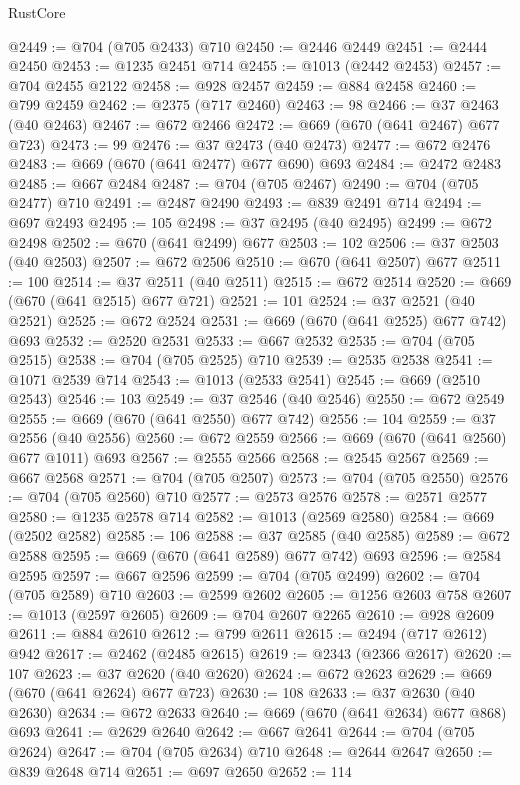 \begin{lexlean}{RustCore}
\begin{coremodule}
@2449 := @704 (@705 @2433) @710
@2450 := @2446 @2449
@2451 := @2444 @2450
@2453 := @1235 @2451 @714
@2455 := @1013 (@2442 @2453)
@2457 := @704 @2455 @2122
@2458 := @928 @2457
@2459 := @884 @2458
@2460 := @799 @2459
@2462 := @2375 (@717 @2460)
@2463 := 98
@2466 := @37 @2463 (@40 @2463)
@2467 := @672 @2466
@2472 := @669 (@670 (@641 @2467) @677 @723)
@2473 := 99
@2476 := @37 @2473 (@40 @2473)
@2477 := @672 @2476
@2483 := @669 (@670 (@641 @2477) @677 @690) @693
@2484 := @2472 @2483
@2485 := @667 @2484
@2487 := @704 (@705 @2467)
@2490 := @704 (@705 @2477) @710
@2491 := @2487 @2490
@2493 := @839 @2491 @714
@2494 := @697 @2493
@2495 := 105
@2498 := @37 @2495 (@40 @2495)
@2499 := @672 @2498
@2502 := @670 (@641 @2499) @677
@2503 := 102
@2506 := @37 @2503 (@40 @2503)
@2507 := @672 @2506
@2510 := @670 (@641 @2507) @677
@2511 := 100
@2514 := @37 @2511 (@40 @2511)
@2515 := @672 @2514
@2520 := @669 (@670 (@641 @2515) @677 @721)
@2521 := 101
@2524 := @37 @2521 (@40 @2521)
@2525 := @672 @2524
@2531 := @669 (@670 (@641 @2525) @677 @742) @693
@2532 := @2520 @2531
@2533 := @667 @2532
@2535 := @704 (@705 @2515)
@2538 := @704 (@705 @2525) @710
@2539 := @2535 @2538
@2541 := @1071 @2539 @714
@2543 := @1013 (@2533 @2541)
@2545 := @669 (@2510 @2543)
@2546 := 103
@2549 := @37 @2546 (@40 @2546)
@2550 := @672 @2549
@2555 := @669 (@670 (@641 @2550) @677 @742)
@2556 := 104
@2559 := @37 @2556 (@40 @2556)
@2560 := @672 @2559
@2566 := @669 (@670 (@641 @2560) @677 @1011) @693
@2567 := @2555 @2566
@2568 := @2545 @2567
@2569 := @667 @2568
@2571 := @704 (@705 @2507)
@2573 := @704 (@705 @2550)
@2576 := @704 (@705 @2560) @710
@2577 := @2573 @2576
@2578 := @2571 @2577
@2580 := @1235 @2578 @714
@2582 := @1013 (@2569 @2580)
@2584 := @669 (@2502 @2582)
@2585 := 106
@2588 := @37 @2585 (@40 @2585)
@2589 := @672 @2588
@2595 := @669 (@670 (@641 @2589) @677 @742) @693
@2596 := @2584 @2595
@2597 := @667 @2596
@2599 := @704 (@705 @2499)
@2602 := @704 (@705 @2589) @710
@2603 := @2599 @2602
@2605 := @1256 @2603 @758
@2607 := @1013 (@2597 @2605)
@2609 := @704 @2607 @2265
@2610 := @928 @2609
@2611 := @884 @2610
@2612 := @799 @2611
@2615 := @2494 (@717 @2612) @942
@2617 := @2462 (@2485 @2615)
@2619 := @2343 (@2366 @2617)
@2620 := 107
@2623 := @37 @2620 (@40 @2620)
@2624 := @672 @2623
@2629 := @669 (@670 (@641 @2624) @677 @723)
@2630 := 108
@2633 := @37 @2630 (@40 @2630)
@2634 := @672 @2633
@2640 := @669 (@670 (@641 @2634) @677 @868) @693
@2641 := @2629 @2640
@2642 := @667 @2641
@2644 := @704 (@705 @2624)
@2647 := @704 (@705 @2634) @710
@2648 := @2644 @2647
@2650 := @839 @2648 @714
@2651 := @697 @2650
@2652 := 114

\end{coremodule}
\end{lexlean}
